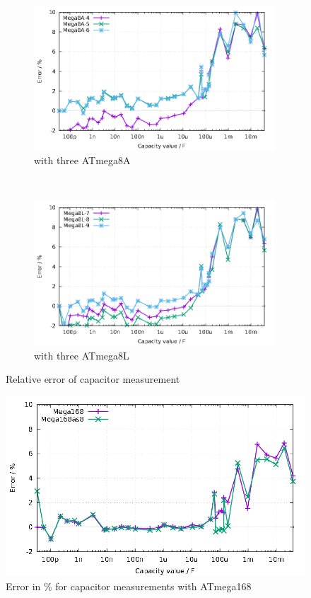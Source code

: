 \begin{figure}[H]
  \begin{subfigure}[b]{9cm}
    \centering
    \includegraphics[width=9cm]{../GNU/Mega8Acap.pdf}
    \caption{with three ATmega8A}
    \label{fig:mega8Acap}
  \end{subfigure}
  ~
  \begin{subfigure}[b]{9cm}
    \centering
    \includegraphics[width=9cm]{../GNU/Mega8Lcap.pdf}
    \caption{with three ATmega8L}
    \label{fig:mega8Lcap}
  \end{subfigure}
  \caption{Relative error of capacitor measurement}
\end{figure}

\begin{figure}[H]
\centering
\includegraphics[width=18cm]{../GNU/Mega168cap.pdf}
\caption{Error in \% for capacitor measurements with ATmega168 }
\label{fig:mega168cap}
\end{figure}

